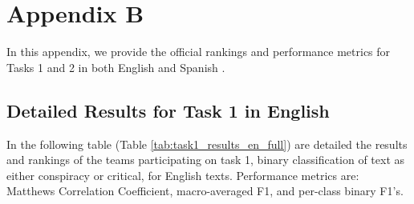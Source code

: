 \documentclass{Configuration_Files/PoliMi3i_thesis}
\begin{document}

\begingroup
\footnotesize %
\endgroup


\cleardoublepage
{} %
\appendix

\chapter{Appendix B} \label{chap:appendix_B}
In this appendix, we provide the official rankings and performance metrics for Tasks 1 and 2 in both English and Spanish \cite{korencic2024oppositional}.

\section{Detailed Results for Task 1 in English}
In the following table (Table \ref{tab:task1_results_en_full}) are detailed the results and rankings of the teams participating on task 1, binary classification of text as either conspiracy or critical, for English texts. Performance metrics are: Matthews Correlation Coefficient, macro-averaged F1, and per-class binary F1’s.
\end{document}
